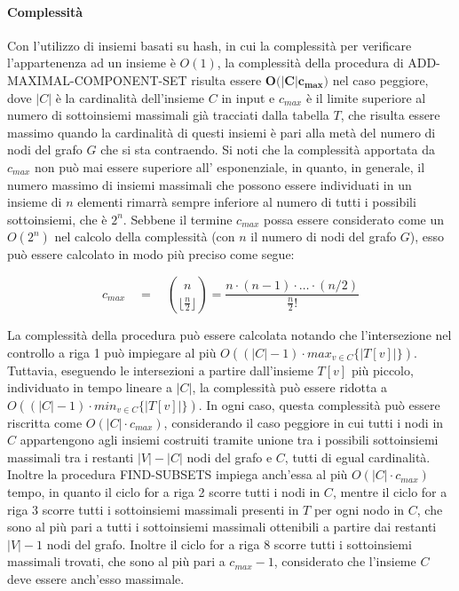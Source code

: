 \paragraph{Complessit\`a}
Con l'utilizzo di insiemi basati su hash, in cui la complessit\`a per verificare l'appartenenza ad un insieme \`e
$O(1)$, la complessit\`a della procedura di ADD-MAXIMAL-COMPONENT-SET risulta essere $\mathbf{O(|C| c_{max}})$ nel caso peggiore,
dove $|C|$ \`e la cardinalit\`a dell'insieme $C$ in input e $c_{max}$ \`e il limite superiore al numero di sottoinsiemi
massimali già tracciati dalla tabella $T$, che risulta essere massimo quando la cardinalit\`a di questi insiemi
\`e pari alla met\`a del numero di nodi del grafo $G$ che si sta contraendo.
Si noti che la complessit\`a apportata da $c_{max}$ non pu\`o mai essere
superiore all' esponenziale, in quanto, in generale, il numero massimo di insiemi massimali che possono essere
individuati in un insieme di $n$ elementi rimarr\`a sempre inferiore al numero di tutti i possibili sottoinsiemi,
che è $2^n$.
Sebbene il termine $c_{max}$ possa essere considerato come un $O(2^n)$ nel calcolo della complessit\`a (con $n$
il numero di nodi del grafo $G$), esso pu\`o essere calcolato in modo pi\`u preciso come segue:

\begin{equation*}
    c_{max} \quad = \quad \binom{n}{\lfloor \frac{n}{2} \rfloor} = \frac{n\cdot(n-1)\cdot\ldots\cdot(n/2)}{\frac{n}{2}!}
\end{equation*}

La complessit\`a della procedura pu\`o essere calcolata notando che l'intersezione nel controllo a riga 1 pu\`o
impiegare al pi\`u $O((|C|-1) \cdot max_{v \in C}\{|T[v]|\})$.
Tuttavia, eseguendo le intersezioni a partire dall'insieme $T[v]$ pi\`u piccolo, individuato in tempo lineare a
$|C|$, la complessit\`a pu\`o essere ridotta a $O((|C|-1) \cdot min_{v \in C}\{|T[v]|\})$.
In ogni caso, questa complessit\`a pu\`o essere riscritta come $O(|C| \cdot c_{max})$, considerando il caso peggiore
in cui tutti i nodi in $C$ appartengono agli insiemi costruiti tramite unione tra i possibili sottoinsiemi massimali
tra i restanti $|V|-|C|$ nodi del grafo e $C$, tutti di egual cardinalit\`a.
Inoltre la procedura FIND-SUBSETS impiega anch'essa al pi\`u $O(|C| \cdot c_{max})$ tempo,
in quanto il ciclo for a riga 2 scorre tutti i nodi in $C$, mentre il ciclo for a riga 3 scorre tutti i
sottoinsiemi massimali presenti in $T$ per ogni nodo in $C$, che sono al pi\`u pari a tutti i sottoinsiemi massimali
ottenibili a partire dai restanti $|V|-1$ nodi del grafo.
Inoltre il ciclo for a riga 8 scorre tutti i sottoinsiemi massimali trovati, che sono al pi\`u pari a $c_{max} - 1$,
considerato che l'insieme $C$ deve essere anch'esso massimale.

